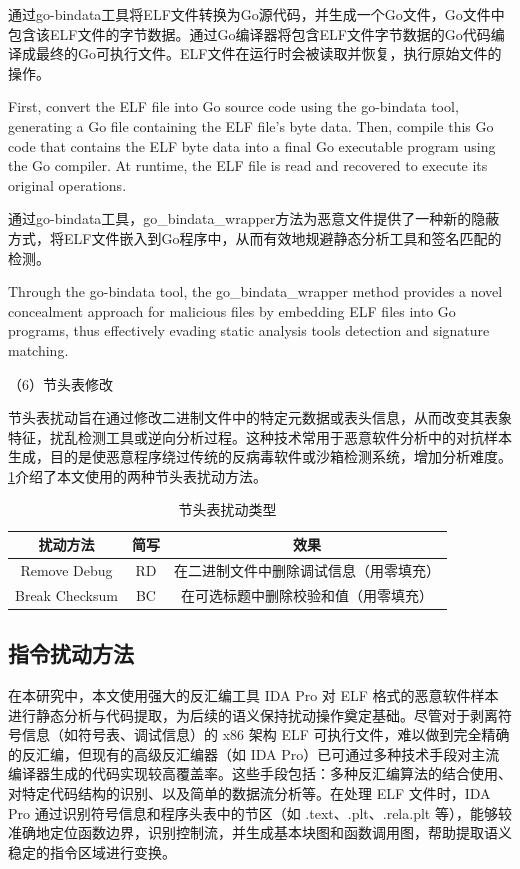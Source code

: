 通过go-bindata工具将ELF文件转换为Go源代码，并生成一个Go文件，Go文件中包含该ELF文件的字节数据。通过Go编译器将包含ELF文件字节数据的Go代码编译成最终的Go可执行文件。ELF文件在运行时会被读取并恢复，执行原始文件的操作。

First, convert the ELF file into Go source code using the go-bindata tool, generating a Go file containing the ELF file's byte data. Then, compile this Go code that contains the ELF byte data into a final Go executable program using the Go compiler. At runtime, the ELF file is read and recovered to execute its original operations.

通过go-bindata工具，go\_bindata\_wrapper方法为恶意文件提供了一种新的隐蔽方式，将ELF文件嵌入到Go程序中，从而有效地规避静态分析工具和签名匹配的检测。

Through the go-bindata tool, the go\_bindata\_wrapper method provides a novel concealment approach for malicious files by embedding ELF files into Go programs, thus effectively evading static analysis tools detection and signature matching.

（6）节头表修改

节头表扰动旨在通过修改二进制文件中的特定元数据或表头信息，从而改变其表象特征，扰乱检测工具或逆向分析过程。这种技术常用于恶意软件分析中的对抗样本生成，目的是使恶意程序绕过传统的反病毒软件或沙箱检测系统，增加分析难度。\ref{tab:4.5}介绍了本文使用的两种节头表扰动方法。

\begin{table}[htbp]
	\centering
	\caption{节头表扰动类型}\label{tab:4.5}
	\begin{tabular*}{0.9\textwidth}{@{\extracolsep{\fill}}ccc}
		\toprule
		扰动方法 & 简写 & 效果 \\
		\midrule
		Remove Debug & RD & 在二进制文件中删除调试信息（用零填充） \\
		Break Checksum & BC & 在可选标题中删除校验和值（用零填充） \\
		\bottomrule
	\end{tabular*}
\end{table}

\subsection{指令扰动方法}

在本研究中，本文使用强大的反汇编工具 IDA Pro 对 ELF 格式的恶意软件样本进行静态分析与代码提取，为后续的语义保持扰动操作奠定基础。尽管对于剥离符号信息（如符号表、调试信息）的 x86 架构 ELF 可执行文件，难以做到完全精确的反汇编，但现有的高级反汇编器（如 IDA Pro）已可通过多种技术手段对主流编译器生成的代码实现较高覆盖率。这些手段包括：多种反汇编算法的结合使用、对特定代码结构的识别、以及简单的数据流分析等。在处理 ELF 文件时，IDA Pro 通过识别符号信息和程序头表中的节区（如 .text、.plt、.rela.plt 等），能够较准确地定位函数边界，识别控制流，并生成基本块图和函数调用图，帮助提取语义稳定的指令区域进行变换。


